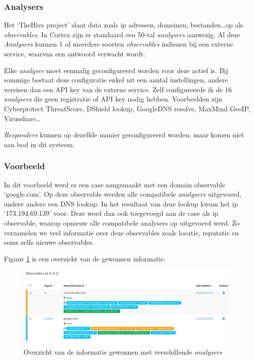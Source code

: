\documentclass[a4paper,12pt]{report}
\begin{document}
\subsubsection{Analysers}
Het `TheHive project' slaat data zoals ip adressen, domeinen, bestanden\dots op als \emph{observables}.
In Cortex zijn er standaard een 50-tal \emph{analysers} aanwezig.
Al deze \emph{Analysers} kunnen 1 of meerdere soorten \emph{observables} indienen bij een externe service, waarvan een antwoord verwacht wordt.

Elke \emph{analyser} moet eenmalig geconfigureerd worden voor deze actief is.
Bij sommige bestaat deze configuratie enkel uit een aantal instellingen, andere vereisen dan een API key van de externe service.
Zelf configureerde ik de 16 \emph{analysers} die geen registratie of API key nodig hebben.
Voorbeelden zijn Cyberprotect ThreatScore, DShield lookup, GoogleDNS resolve, MaxMind GeoIP, Virusshare\dots

\emph{Responders} kunnen op dezelfde manier geconfigureerd worden, maar komen niet aan bod in dit systeem.

\subsubsection{Voorbeeld}
In dit voorbeeld werd er een case aangemaakt met een domain observable `google.com'.
Op deze observable werden alle compatibele \emph{analysers} uitgevoerd, ondere andere een DNS lookup.
In het resultaat van deze lookup kwam het ip `173.194.69.139' voor.
Deze werd dan ook toegevoegd aan de case als ip observable, waarop opnieuw alle compatibele analysers op uitgevoerd werd.
Zo verzamelen we veel informatie over deze observables zoals locatie, reputatie en soms zelfs nieuwe observables.

Figuur \ref{fig:thehive-example} is een overzicht van de gewonnen informatie.

\begin{figure}[H]
  \centering
  \includegraphics[width=\textwidth]{thehive-example}
  \caption{Overzicht van de informatie gewonnen met verschillende \emph{analysers}}
  \label{fig:thehive-example}
\end{figure}
\end{document}
